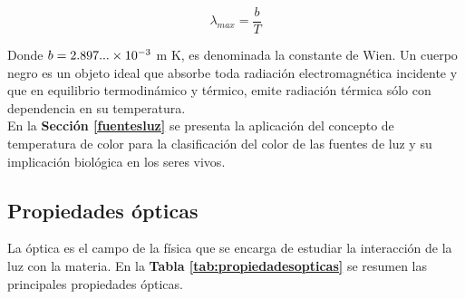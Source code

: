 \begin{equation}
\lambda_{max}=\dfrac{b}{T}
\end{equation}

Donde $b = 2.897...\times 10^{-3}$ m K, es denominada la constante de Wien. Un cuerpo negro es un objeto ideal que absorbe toda radiación electromagnética incidente y que en equilibrio termodinámico y térmico, emite radiación térmica sólo con dependencia en su temperatura.\\

En la \textbf{Sección \ref{fuentesluz}} se presenta la aplicación del concepto de temperatura de color para la clasificación del color de las fuentes de luz y su implicación biológica en los seres vivos.\\

\subsection{Propiedades ópticas}

La óptica es el campo de la física que se encarga de estudiar la interacción de la luz con la materia. En la  \textbf{Tabla \ref{tab:propiedadesopticas}} se resumen las principales propiedades ópticas.\\


